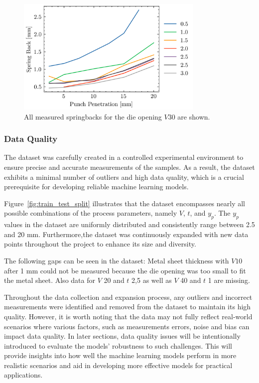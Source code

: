\begin{figure}[h]
    \begin{tcolorbox}[arc=0pt,boxrule=0.5pt]
        \centering
        \includegraphics[width=0.8\textwidth]{chap4/images/all-springbacks-consolidated}
    \end{tcolorbox}
    \caption{All measured springbacks for the die opening $V30$ are shown. }
    \label{fig:v30_springbacks}
\end{figure}

\subsubsection{Data Quality}
The dataset was carefully created in a controlled experimental environment to ensure precise and accurate
measurements of the samples.
As a result, the dataset exhibits a minimal number of outliers and high data quality,
which is a crucial prerequisite for developing reliable machine learning models.

Figure~\ref{fig:train_test_split} illustrates that the dataset encompasses nearly all possible combinations of the
process parameters, namely $V$, $t$, and $y_p$.
The $y_p$ values in the dataset are uniformly distributed and consistently range between 2.5 and 20 mm.
Furthermore,the dataset was continuously expanded with new data points throughout the project to enhance its size and
diversity.

The following gaps can be seen in the dataset: Metal sheet thickness with $V10$  after 1 mm could not be measured
because the die opening was too small to fit the metal sheet.
Also data for $V$ 20 and $t$ 2,5 as well as $V$ 40 and $t$ 1 are missing.

Throughout the data collection and expansion process, any outliers and incorrect measurements were identified and
removed from the dataset to maintain its high quality.
However, it is worth noting that the data may not fully reflect real-world scenarios where various factors, such as
measurements errors, noise and bias can impact data quality.
In later sections, data quality issues will be intentionally introduced to evaluate the models' robustness to such
challenges.
This will provide insights into how well the machine learning models perform in more realistic scenarios and aid in
developing more effective models for practical applications.

